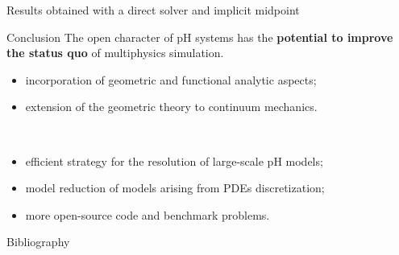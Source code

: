 \documentclass[aspectratio=169]{beamer}
\begin{document}
\begin{frame}{Results obtained with a direct solver and implicit midpoint}
	
	
\end{frame}

\begin{frame}{Conclusion}
	The open character of pH systems has the \textbf{potential to improve the status quo} of multiphysics simulation.  \\
	\vspace{.3cm}
	\begin{tcolorbox}[nobeforeafter, colframe=theme,title=Analytical developments]%
	\begin{itemize}
		\item incorporation of geometric and functional analytic aspects;
		\item extension of the geometric theory to continuum mechanics.
	\end{itemize}
	\end{tcolorbox} 
	\vspace{.3cm}\\
	\begin{tcolorbox}[nobeforeafter, colframe=theme,title=Application oriented developments]%
	\begin{itemize}
		\item efficient strategy for the resolution of large-scale pH models;
		\item model reduction of models arising from PDEs discretization;
		\item more open-source code and benchmark problems.
	\end{itemize}
	\end{tcolorbox}

\end{frame}
	
\begin{frame}{Bibliography}
	\printbibliography
\end{frame}

	\appendix
	
	
	
	
\end{document}
